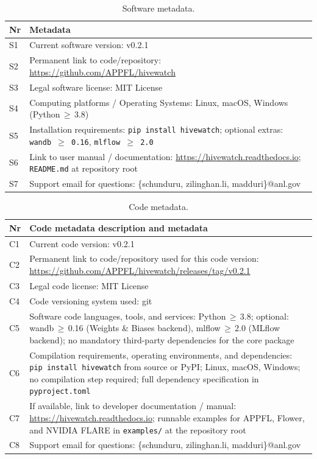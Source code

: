 \begin{table}[h]
\caption{Software metadata.}
\label{tab:softwaremeta}
\centering
\begin{tabularx}{\textwidth}{lX}
\toprule
\textbf{Nr} & \textbf{Metadata} \\
\midrule
S1 & Current software version: v0.2.1 \\
S2 & Permanent link to code/repository:
     \url{https://github.com/APPFL/hivewatch} \\
S3 & Legal software license: MIT License \\
S4 & Computing platforms / Operating Systems: Linux, macOS, Windows (Python\,$\geq$\,3.8) \\
S5 & Installation requirements: \texttt{pip install hivewatch}; optional extras: \texttt{wandb\,$\geq$\,0.16}, \texttt{mlflow\,$\geq$\,2.0} \\
S6 & Link to user manual / documentation: \url{https://hivewatch.readthedocs.io}; \texttt{README.md} at repository root \\
S7 & Support email for questions: \{schunduru, zilinghan.li, madduri\}@anl.gov \\
\bottomrule
\end{tabularx}
\end{table}

\begin{table}[h]
\caption{Code metadata.}
\label{tab:codemeta}
\centering
\begin{tabularx}{\textwidth}{lX}
\toprule
\textbf{Nr} & \textbf{Code metadata description and metadata} \\
\midrule
C1 & Current code version: v0.2.1 \\
C2 & Permanent link to code/repository used for this code version:
     \url{https://github.com/APPFL/hivewatch/releases/tag/v0.2.1} \\
C3 & Legal code license: MIT License \\
C4 & Code versioning system used: git \\
C5 & Software code languages, tools, and services: Python\,$\geq$\,3.8;
     optional: wandb\,$\geq$\,0.16 (Weights \& Biases backend),
     mlflow\,$\geq$\,2.0 (MLflow backend); no mandatory third-party dependencies
     for the core package \\
C6 & Compilation requirements, operating environments, and dependencies:
     \texttt{pip install hivewatch} from source or PyPI;
     Linux, macOS, Windows; no compilation step required;
     full dependency specification in \texttt{pyproject.toml} \\
C7 & If available, link to developer documentation / manual:
     \url{https://hivewatch.readthedocs.io};
     runnable examples for APPFL, Flower, and NVIDIA FLARE in
     \texttt{examples/} at the repository root \\
C8 & Support email for questions:
     \{schunduru, zilinghan.li, madduri\}@anl.gov \\
\bottomrule
\end{tabularx}
\end{table}
